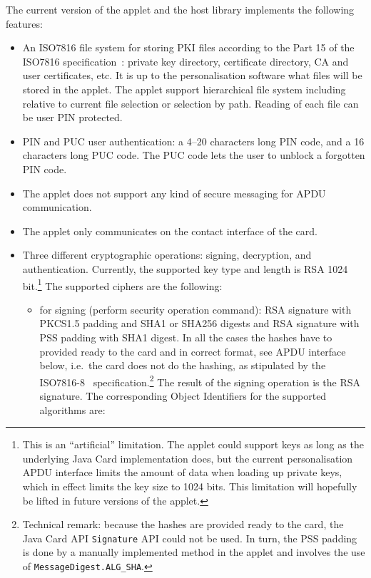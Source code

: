 \documentclass{article}
\begin{document}
The current version of the applet and the host library implements the
following features:
\begin{itemize}
\item An ISO7816 file system for storing PKI files according to the
  Part 15 of the ISO7816 specification~\cite{ISO15}: private key
  directory, certificate directory, CA and user certificates, etc.  It
  is up to the personalisation software what files will be stored in
  the applet.  The applet support hierarchical file system including
  relative to current file selection or selection by path. Reading of
  each file can be user PIN protected.
\item PIN and PUC user authentication: a 4--20 characters long PIN
  code, and a 16 characters long PUC code. The PUC code lets the user
  to unblock a forgotten PIN code.
\item The applet does not support any kind of secure messaging for
  APDU communication.
\item The applet only communicates on the contact interface of the
  card.
\item Three different cryptographic operations: signing, decryption,
  and authentication.  Currently, the supported key type and length is
  RSA 1024 bit.\footnote{This is an ``artificial'' limitation.  The
    applet could support keys as long as the underlying Java Card
    implementation does, but the current personalisation APDU
    interface limits the amount of data when loading up private keys,
    which in effect limits the key size to 1024 bits. This limitation
    will hopefully be lifted in future versions of the applet.} The
  supported ciphers are the following:
\begin{itemize}
\item for signing (perform security operation command): RSA signature
  with PKCS1.5 padding and SHA1 or SHA256 digests and RSA signature
  with PSS padding with SHA1 digest.  In all the cases the hashes have
  to provided ready to the card and in correct format, see APDU
  interface below, i.e.\ the card does not do the hashing, as
  stipulated by the ISO7816-8~\cite{ISO8} specification.\footnote{%
    Technical remark: because the hashes are provided ready to the
    card, the Java Card API \texttt{Signature} API could not be
    used. In turn, the PSS padding is done by a manually implemented
    method in the applet and involves the use of
    \texttt{MessageDigest.ALG\_SHA}.} The result of the signing
  operation is the RSA signature.  The corresponding Object
  Identifiers for the supported algorithms are:

\end{itemize}
\end{itemize}
\end{document}
